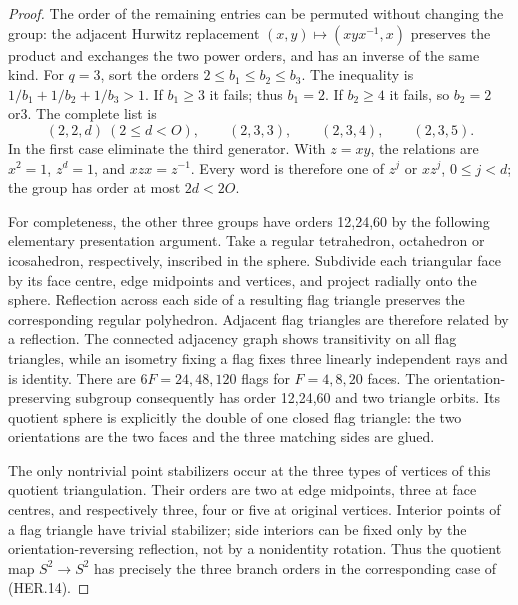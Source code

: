 \begin{proof}
The order of the remaining entries can be permuted without changing
the group: the adjacent Hurwitz replacement
\((x,y)\mapsto(xyx^{-1},x)\) preserves the product and exchanges the
two power orders, and has an inverse of the same kind.  For \(q=3\),
sort the orders \(2\le b_1\le b_2\le b_3\).  The inequality is
\(1/b_1+1/b_2+1/b_3>1\).  If \(b_1\ge3\) it fails; thus \(b_1=2\).
If \(b_2\ge4\) it fails, so \(b_2=2\) or3.  The complete list is
\[
 (2,2,d)\ (2\le d<O),\qquad
 (2,3,3),\qquad(2,3,4),\qquad(2,3,5).
 \tag{HER.14}
\]
In the first case eliminate the third generator.  With \(z=xy\),
the relations are \(x^2=1\), \(z^d=1\), and \(xzx=z^{-1}\).
Every word is therefore one of \(z^j\) or \(xz^j\),
\(0\le j<d\); the group has order at most \(2d<2O\).

For completeness, the other three groups have orders 12,24,60 by
the following elementary presentation argument.  Take a regular
tetrahedron, octahedron or icosahedron, respectively, inscribed in
the sphere.  Subdivide each triangular face by its face centre,
edge midpoints and vertices, and project radially onto the sphere.
Reflection across each side of a resulting flag triangle preserves
the corresponding regular polyhedron.  Adjacent flag triangles
are therefore related by a reflection.  The connected adjacency
graph shows transitivity on all flag triangles, while an isometry
fixing a flag fixes three linearly independent rays and is identity.
There are \(6F=24,48,120\) flags for \(F=4,8,20\) faces.  The
orientation-preserving subgroup consequently has order 12,24,60
and two triangle orbits.  Its quotient sphere is explicitly the
double of one closed flag triangle: the two orientations are the
two faces and the three matching sides are glued.

The only nontrivial point stabilizers occur at the three types of
vertices of this quotient triangulation.  Their orders are two at
edge midpoints, three at face centres, and respectively three,
four or five at original vertices.  Interior points of a flag
triangle have trivial stabilizer; side interiors can be fixed only
by the orientation-reversing reflection, not by a nonidentity
rotation.  Thus the quotient map \(S^2\to S^2\) has precisely the
three branch orders in the corresponding case of (HER.14).


\end{proof}

